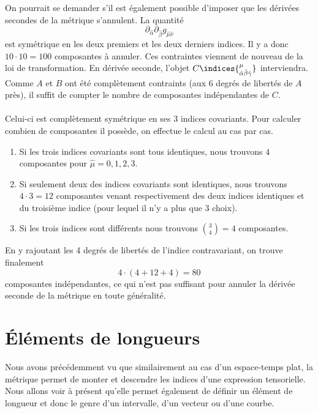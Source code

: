 \begin{rmk}
On pourrait se demander s'il est également possible d'imposer que les dérivées secondes de la métrique s'annulent. La quantité
\begin{equation}
    \partial_{\hat{\alpha}}\partial_{\hat{\beta}}g_{\hat{\mu}\hat{\nu}}
\end{equation}
est symétrique en les deux premiers et les deux derniers indices. Il y a donc $10\cdot 10=100$ composantes à annuler. Ces contraintes viennent de nouveau de la loi de transformation. En dérivée seconde, l'objet $C\indices{^{\mu}_{\hat{\alpha}\hat{\beta}\hat{\gamma}}}$ interviendra. Comme $A$ et $B$ ont été complètement contraints (aux 6 degrés de libertés de $A$ près), il suffit de compter le nombre de composantes indépendantes de $C$.\\
\\
Celui-ci est complètement symétrique en ses $3$ indices covariants. Pour calculer combien de composantes il possède, on effectue le calcul au cas par cas. 
\begin{enumerate}
    \item Si les trois indices covariants sont tous identiques, nous trouvons $4$ composantes pour $\hat{\mu} = 0,1,2,3$.
    \item Si seulement deux des indices covariants sont identiques, nous trouvons $4 \cdot 3 = 12$ composantes venant respectivement des deux indices identiques et du troisième indice (pour lequel il n'y a plus que 3 choix).
    \item Si les trois indices sont différents nous trouvons ${3\choose 4} = 4$ composantes.
\end{enumerate}
En y rajoutant les 4 degrés de libertés de l'indice contravariant, on trouve finalement
\begin{equation}
    4\cdot (4+12+4)=80
\end{equation}
composantes indépendantes, ce qui n'est pas suffisant pour annuler la dérivée seconde de la métrique en toute généralité.
\end{rmk}

\section{Éléments de longueurs}
Nous avons précédemment vu que similairement au cas d'un espace-temps plat, la métrique permet de monter et descendre les indices d'une expression tensorielle. Nous allons voir à présent qu'elle permet également de définir un élément de longueur et donc le genre d'un intervalle, d'un vecteur ou d'une courbe. 

